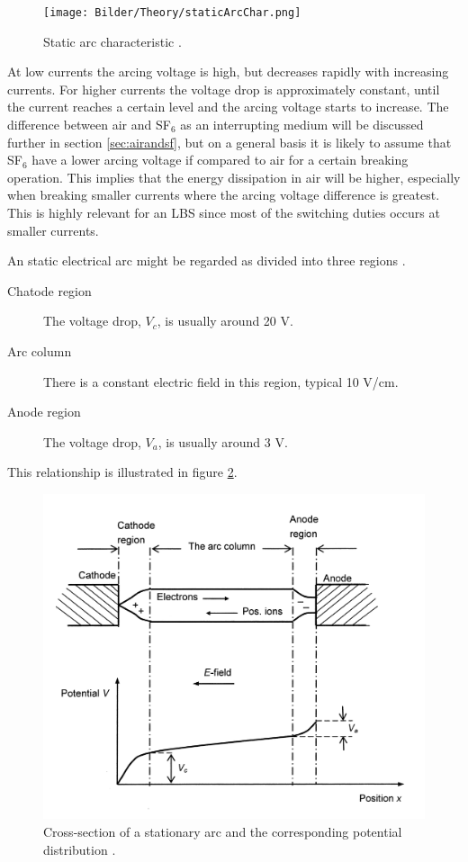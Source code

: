 \documentclass[10pt,a4paper]{article} %
\begin{document}
\begin{figure}[H]
\centering
\texttt{[image: Bilder/Theory/staticArcChar.png]}
\caption{Static arc characteristic  \cite{bib:HVEbreak}.} \label{fig:staticArcChar}
\end{figure}

At low currents the arcing voltage is high, but decreases rapidly with increasing currents. For higher currents the voltage drop is approximately constant, until the current reaches a certain level and the arcing voltage starts to increase. The difference between air and SF$_6$ as an interrupting medium will be discussed further in section \ref{sec:airandsf}, but on a general basis it is likely to assume that SF${_6}$ have a lower arcing voltage if compared to air for a certain breaking operation. This implies that the energy dissipation in air will be higher, especially when breaking smaller currents where the arcing voltage difference is greatest. This is highly relevant for an LBS since most of the switching duties occurs at smaller currents.

An static electrical arc might be regarded as divided into three regions \cite{bib:HVEbreak}.
\begin{description}
\item[Chatode region] The voltage drop, $V_c$, is usually around 20 V.
\item[Arc column]	There is a constant electric field in this region, typical 10 V/cm.
\item[Anode region] The voltage drop, $V_a$, is usually around 3 V.
\end{description}

This relationship is illustrated in figure \ref{fig:potDisArc}.
\begin{figure}[H]
\centering
\includegraphics[scale=0.8]{Bilder/Theory/potentialDistArc.png}
\caption{Cross-section of a stationary arc and the corresponding potential distribution \cite{bib:HVEbreak}.} \label{fig:potDisArc}
\end{figure}
\end{document}
